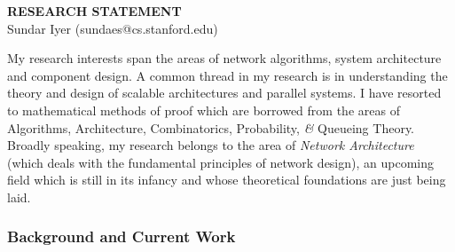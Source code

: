 \documentclass[a4paper, 12pt]{article}
\begin{document}
\thispagestyle{fancy}
\lhead{}
\rhead{}
\renewcommand{\headrulewidth}{0pt}
\renewcommand{\footrulewidth}{0pt}
\fancyfoot[C]{\footnotesize \textcolor{gray}{http://www.stanford.edu/$\sim$sundaes/application}}


\pagestyle{fancy}
\lhead{\textcolor{gray}{\it Sundar Iyer}}
\rhead{\textcolor{gray}{\thepage/\totalpages{}}}

\begin{small}

\begin{center}
{\LARGE \bf RESEARCH STATEMENT}\\
\vspace*{0.1cm}
{\normalsize Sundar Iyer (sundaes@cs.stanford.edu)}
\end{center}



My research interests span the areas of network algorithms, system
architecture and component design. A common thread in my research is in understanding the
theory and design of scalable architectures and parallel systems.
I have resorted to mathematical methods
of proof which are borrowed from the areas of Algorithms,
Architecture, Combinatorics, Probability, {\it \&} Queueing Theory.
Broadly speaking, my research belongs to
the area of {\it Network Architecture} (which deals with the fundamental
principles of network design),
an upcoming field which is still in its infancy and whose theoretical foundations are just being laid.


\subsubsection*{Background and Current Work}


\end{small}
\end{document}
